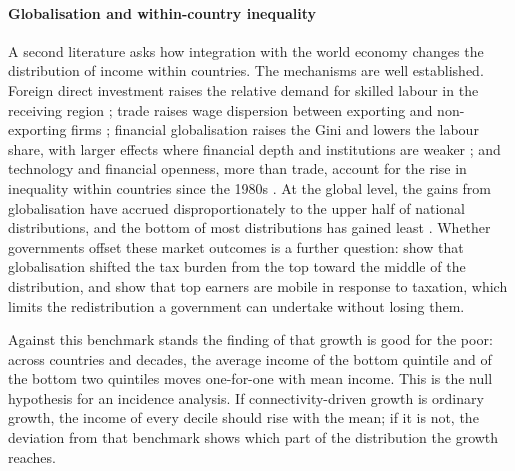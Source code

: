 \paragraph{Globalisation and within-country inequality}
A second literature asks how integration with the world economy changes the distribution of income within countries. The mechanisms are well established. Foreign direct investment raises the relative demand for skilled labour in the receiving region \citep{Feenstra_1997}; trade raises wage dispersion between exporting and non-exporting firms \citep{Helpman_2017}; financial globalisation raises the Gini and lowers the labour share, with larger effects where financial depth and institutions are weaker \citep{Furceri_2019}; and technology and financial openness, more than trade, account for the rise in inequality within countries since the 1980s \citep{Jaumotte_2013}. At the global level, the gains from globalisation have accrued disproportionately to the upper half of national distributions, and the bottom of most distributions has gained least \citep{Lang_2023,Alvaredo_2018}. Whether governments offset these market outcomes is a further question: \citet{Egger_2019} show that globalisation shifted the tax burden from the top toward the middle of the distribution, and \citet{Kleven_2013} show that top earners are mobile in response to taxation, which limits the redistribution a government can undertake without losing them.

Against this benchmark stands the finding of \citet{Dollar_2016} that growth is good for the poor: across countries and decades, the average income of the bottom quintile and of the bottom two quintiles moves one-for-one with mean income. This is the null hypothesis for an incidence analysis. If connectivity-driven growth is ordinary growth, the income of every decile should rise with the mean; if it is not, the deviation from that benchmark shows which part of the distribution the growth reaches.


